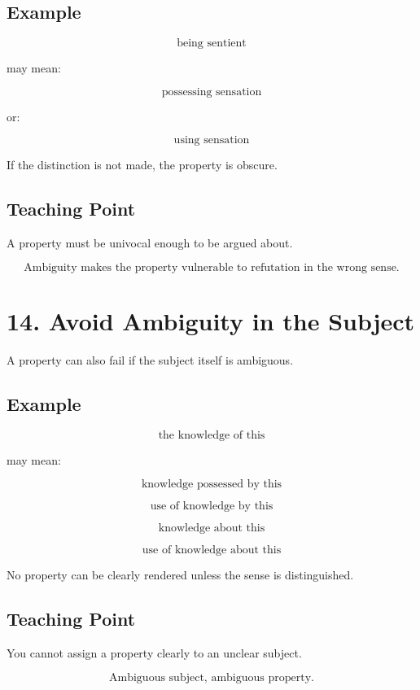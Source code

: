 \documentclass[12pt]{article}
\begin{document}
\subsection*{Example}

\[
\text{being sentient}
\]

may mean:

\[
\text{possessing sensation}
\]

or:

\[
\text{using sensation}
\]

If the distinction is not made, the property is obscure.

\subsection*{Teaching Point}

A property must be univocal enough to be argued about.

\[
\boxed{
\text{Ambiguity makes the property vulnerable to refutation in the wrong sense.}
}
\]

\section*{14. Avoid Ambiguity in the Subject}

A property can also fail if the subject itself is ambiguous.

\subsection*{Example}

\[
\text{the knowledge of this}
\]

may mean:

\[
\text{knowledge possessed by this}
\]

\[
\text{use of knowledge by this}
\]

\[
\text{knowledge about this}
\]

\[
\text{use of knowledge about this}
\]

No property can be clearly rendered unless the sense is distinguished.

\subsection*{Teaching Point}

You cannot assign a property clearly to an unclear subject.

\[
\boxed{
\text{Ambiguous subject, ambiguous property.}
}
\]
\end{document}
